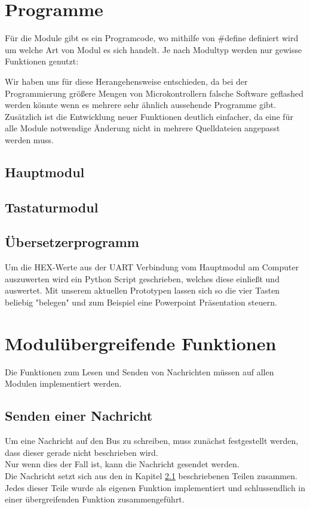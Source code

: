 \section{Programme}
Für die Module gibt es ein Programcode, wo mithilfe von #define definiert wird um welche Art von Modul es sich handelt. Je nach Modultyp werden nur gewisse Funktionen genutzt:


Wir haben uns für diese Herangehensweise entschieden, da bei der Programmierung größere Mengen von Microkontrollern falsche Software geflashed werden könnte wenn es mehrere sehr ähnlich aussehende Programme gibt. Zusätzlich ist die Entwicklung neuer Funktionen deutlich einfacher, da eine für alle Module notwendige Änderung nicht in mehrere Quelldateien angepasst werden muss.


\subsection{Hauptmodul}


\subsection{Tastaturmodul}
\subsection{Übersetzerprogramm}
Um die HEX-Werte aus der UART Verbindung vom Hauptmodul am Computer auszuwerten wird ein Python Script geschrieben, welches diese einließt und auswertet. Mit unserem aktuellen Prototypen lassen sich so die vier Tasten beliebig "belegen" und zum Beispiel eine Powerpoint Präsentation steuern.
\\

\section{Modulübergreifende Funktionen}
\textmd{Die Funktionen zum Lesen und Senden von Nachrichten müssen auf allen Modulen implementiert werden.\\
}
\subsection{Senden einer Nachricht}
\textmd{Um eine Nachricht auf den Bus zu schreiben, muss zunächst festgestellt werden, dass dieser gerade nicht beschrieben wird.\\
	Nur wenn dies der Fall ist, kann die Nachricht gesendet werden. \\
	Die Nachricht setzt sich aus den in Kapitel \ref{} beschriebenen Teilen zusammen. Jedes dieser Teile wurde als eigenen Funktion implementiert und schlussendlich in einer übergreifenden Funktion zusammengeführt.\\
}


